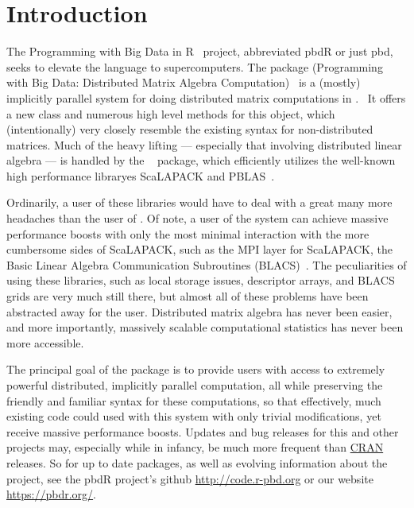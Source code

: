 \section{Introduction}
\label{sec:introduction}

The Programming with Big Data in R~\citep{pbdr2012} project, abbreviated pbdR or just pbd, seeks to elevate the  language to supercomputers.  
The  package (Programming with Big Data: Distributed Matrix Algebra Computation)~\citep{Schmidt2012pbdDMATpackage} is a (mostly) implicitly parallel system for doing distributed matrix computations in .~\citep{Rcore}  It offers a new  class  and numerous high level methods for this object, which (intentionally) very closely resemble the existing  syntax for non-distributed matrices.  Much of the heavy lifting --- especially that involving distributed linear algebra --- is handled by the ~\citep{Schmidt2012pbdBASEpackage} package, which efficiently utilizes the well-known high performance libraryes ScaLAPACK and PBLAS~\citep{slug}.

Ordinarily, a user of these libraries would have to deal with a great many more headaches than the user of .  Of note, a user of the  system can achieve massive performance boosts with only the most minimal interaction with the more cumbersome sides of ScaLAPACK, such as the MPI layer for ScaLAPACK, the Basic Linear Algebra Communication Subroutines (BLACS)~\citep{blug}.  The peculiarities of using these libraries, such as local storage issues, descriptor arrays, and BLACS grids are very much still there, but almost all of these problems have been abstracted away for the user.  Distributed matrix algebra has never been easier, and more importantly, massively scalable computational statistics has never been more accessible.

The principal goal of the  package is to provide  users with access to extremely powerful distributed, implicitly parallel computation, all while preserving the friendly and familiar  syntax for these computations, so that effectively, much existing  code could used with this system with only trivial modifications, yet receive massive performance boosts.  Updates and bug releases for this and other  projects may, especially while in infancy, be much more frequent than \href{https://cran.r-project.org/}{CRAN} releases.  So for up to date packages, as well as evolving information about the  project,  see the pbdR project's github \url{http://code.r-pbd.org} or our website \href{https://pbdr.org/}{https://pbdr.org/}.






